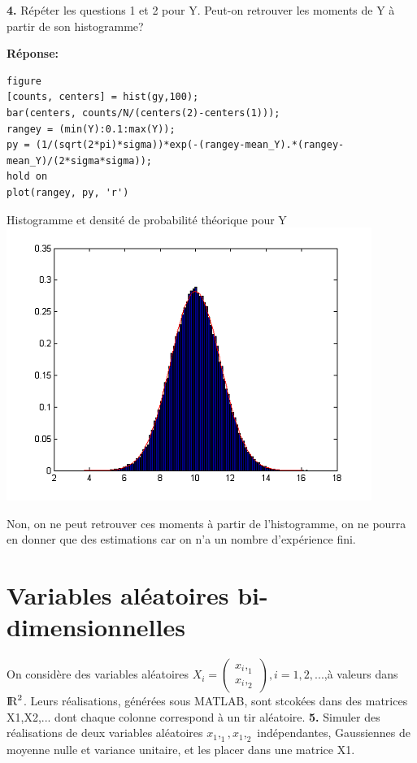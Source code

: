 \documentclass[12pt]{article}
\begin{document}
\smallbreak

\textbf{4. }Répéter les questions 1 et 2 pour Y. Peut-on retrouver les moments de Y à partir de son histogramme?

\smallbreak
\textbf{Réponse:}
\begin{lstlisting}[style=Matlab-editor]
figure
[counts, centers] = hist(gy,100);
bar(centers, counts/N/(centers(2)-centers(1)));
rangey = (min(Y):0.1:max(Y));
py = (1/(sqrt(2*pi)*sigma))*exp(-(rangey-mean_Y).*(rangey-mean_Y)/(2*sigma*sigma));
hold on
plot(rangey, py, 'r')
\end{lstlisting}


\begin{flushleft}
Histogramme et densité de probabilité théorique pour Y
\includegraphics{1_4_10000.PNG}
\end{flushleft}

Non, on ne peut retrouver ces moments à partir de l'histogramme, on ne pourra en donner que des estimations car on n'a un nombre d'expérience fini.
 
\smallbreak

\section{Variables aléatoires bi-dimensionnelles}
On considère des variables aléatoires $X_i =  \begin{pmatrix}
x_i,_1 \\
x_i,_2
\end{pmatrix},i=1,2,...$,à valeurs dans ${\rm I\!R}^2$. Leurs réalisations, générées sous MATLAB, sont stcokées dans des matrices X1,X2,... dont chaque colonne correspond à un tir aléatoire.
\smallbreak
\textbf{5. }Simuler des réalisations de deux variables aléatoires $x_1,_1 , x_1,_2$ indépendantes, Gaussiennes de moyenne nulle et variance unitaire, et les placer dans une matrice X1.
\end{document}
